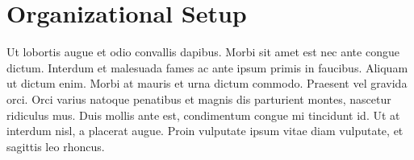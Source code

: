 \section{Organizational Setup}
Ut lobortis augue et odio convallis dapibus. Morbi sit amet est nec ante congue dictum. Interdum et malesuada fames ac ante ipsum primis in faucibus. Aliquam ut dictum enim. Morbi at mauris et urna dictum commodo. Praesent vel gravida orci. Orci varius natoque penatibus et magnis dis parturient montes, nascetur ridiculus mus. Duis mollis ante est, condimentum congue mi tincidunt id. Ut at interdum nisl, a placerat augue. Proin vulputate ipsum vitae diam vulputate, et sagittis leo rhoncus. 